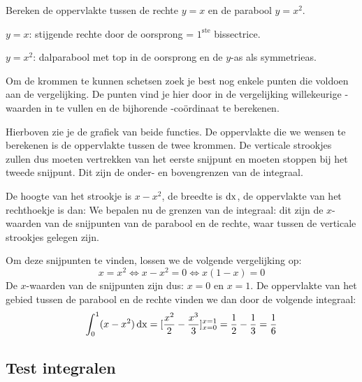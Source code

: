 \begin{voorbeeld}
	Bereken de oppervlakte tussen de rechte $y=x$ en de parabool $y=x^2$.
	
$y=x$: stijgende rechte door de oorsprong = $1^{\text{ste}}$ bissectrice.

$y=x^2$: dalparabool met top in de oorsprong en de $y$-as als symmetrieas.

Om de krommen te kunnen schetsen zoek je best nog enkele punten die voldoen aan de vergelijking. De punten vind je hier door in de vergelijking willekeurige -waarden in te vullen en de bijhorende -coördinaat te berekenen.

Hierboven zie je de grafiek van beide functies. De oppervlakte die we wensen te berekenen is de oppervlakte tussen de twee krommen. De verticale strookjes zullen dus moeten vertrekken van het eerste snijpunt en moeten stoppen bij het tweede snijpunt. Dit zijn de onder- en bovengrenzen van de integraal.

De hoogte van het strookje is $x-x^2$, de breedte is $\operatorname{dx}$, de oppervlakte van het rechthoekje is dan: 
We bepalen nu de grenzen van de integraal: dit zijn de $x$-waarden van de snijpunten van de parabool en de rechte, waar tussen de verticale strookjes gelegen zijn.

Om deze snijpunten te vinden, lossen we de volgende vergelijking op:
\begin{equation*}
x=x^2 \iff x-x^2=0 \iff x(1-x)=0
\end{equation*}
De $x$-waarden van de snijpunten zijn dus: $x=0$ en $x=1$. 
De oppervlakte van het gebied tussen de parabool en de rechte vinden we dan door de volgende integraal:
\begin{equation*}
\int_{0}^{1} (x-x^2)\operatorname{dx} = [\frac{x^2}{2}-\frac{x^3}{3}]_{x=0}^{x=1}=\frac{1}{2}-\frac{1}{3}=\frac{1}{6}
\end{equation*}
\end{voorbeeld}


\subsection{Test integralen}
